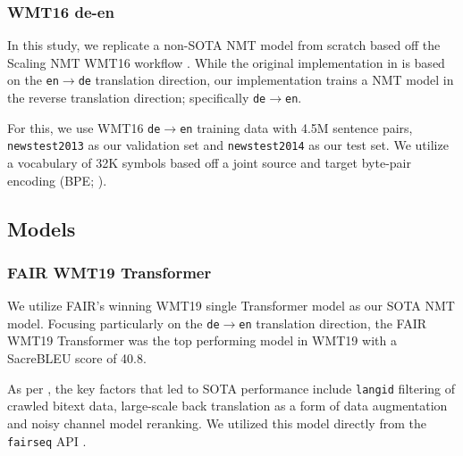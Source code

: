 \documentclass[11pt,a4paper]{article}
\begin{document}
\subsubsection{WMT16 de-en}

In this study, we replicate a non-SOTA NMT model from scratch based off the Scaling NMT WMT16 workflow \cite{ott2018scaling}. While the original implementation in \citet{ott2018scaling} is based on the \texttt{en$\rightarrow$de} translation direction, our implementation trains a NMT model in the reverse translation direction; specifically \texttt{de$\rightarrow$en}.

For this, we use WMT16 \texttt{de$\rightarrow$en} training data with 4.5M sentence pairs, \texttt{newstest2013} as our validation set and \texttt{newstest2014} as our test set. We utilize a vocabulary of 32K symbols based off a joint source and target byte-pair encoding (BPE; \citealt{sennrich2015neural}).   


\subsection{Models}

\subsubsection{FAIR WMT19 Transformer}

We utilize FAIR's winning WMT19 single Transformer model as our SOTA NMT model. Focusing particularly on the \texttt{de$\rightarrow$en} translation direction, the FAIR WMT19 Transformer was the top performing model in WMT19 with a SacreBLEU \cite{post-2018-call} score of 40.8.

As per \citet{ng2019facebook}, the key factors that led to SOTA performance include \texttt{langid} filtering of crawled bitext data, large-scale back translation as a form of data augmentation and noisy channel model reranking. We utilized this model directly from the \texttt{fairseq} API \cite{ott2019fairseq}. 
\end{document}
